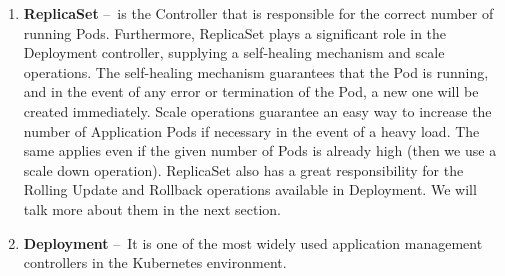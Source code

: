 \begin{enumerate}
    \item \textbf{ReplicaSet} \---\ is the Controller that is responsible for the correct number of running Pods. Furthermore, ReplicaSet plays a significant role in the Deployment controller, supplying a self-healing mechanism and scale operations. The self-healing mechanism guarantees that the Pod is running, and in the event of any error or termination of the Pod, a new one will be created immediately. Scale operations guarantee an easy way to increase the number of Application Pods if necessary in the event of a heavy load. The same applies even if the given number of Pods is already high (then we use a scale down operation). ReplicaSet also has a great responsibility for the Rolling Update and Rollback operations available in Deployment. We will talk more about them in the next section.

    \item \textbf{Deployment} \---\ It is one of the most widely used application management controllers in the Kubernetes environment. 
    

\end{enumerate}
